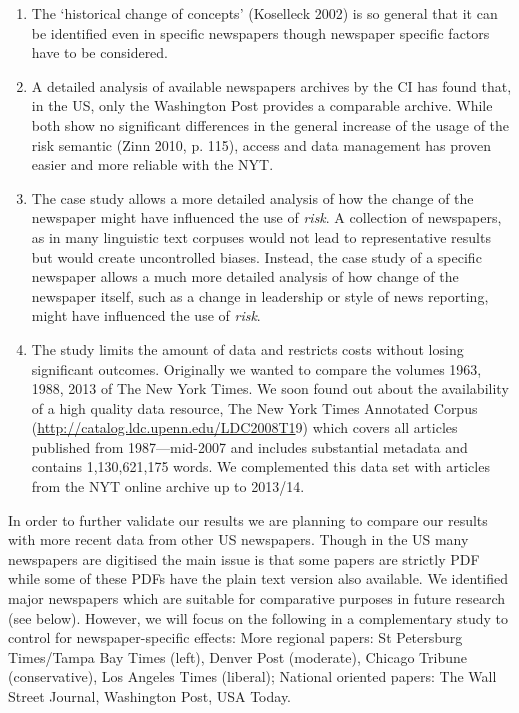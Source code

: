 \begin{enumerate}
\item The `historical change of concepts' (Koselleck 2002) is so general that it can be identified even in specific newspapers though newspaper specific factors have to be considered. 
\item A detailed analysis of available newspapers archives by the CI has found that, in the US, only the Washington Post provides a comparable archive. While both show no significant differences in the general increase of the usage of the risk semantic (Zinn 2010, p. 115), access and data management has proven easier and more reliable with the NYT. 
\item The case study allows a more detailed analysis of how the change of the newspaper might have influenced the use of \emph{risk}. A collection of newspapers, as in many linguistic text corpuses would not lead to representative results but would create uncontrolled biases. Instead, the case study of a specific newspaper allows a much more detailed analysis of how change of the newspaper itself, such as a change in leadership or style of news reporting, might have influenced the use of \emph{risk}.  
\item The study limits the amount of data and restricts costs without losing significant outcomes.
Originally we wanted to compare the volumes 1963, 1988, 2013 of The New York Times. We soon found out about the availability of a high quality data resource, The New York Times Annotated Corpus (\url{http://catalog.ldc.upenn.edu/LDC2008T1}9) which covers all articles published from 1987---mid-2007 and includes substantial metadata and contains 1,130,621,175 words. We complemented this data set with articles from the NYT online archive up to 2013\slash 14.
\end{enumerate}
%
In order to further validate our results we are planning to compare our results with more recent data from other US newspapers. Though in the US many newspapers are digitised the main issue is that some papers are strictly PDF while some of these PDFs have the plain text version also available. We identified major newspapers which are suitable for comparative purposes in future research (see below). However, we will focus on the following in a complementary study to control for newspaper-specific effects: More regional papers: St Petersburg Times\slash Tampa Bay Times (left), Denver Post (moderate), Chicago Tribune (conservative), Los Angeles Times (liberal); National oriented papers: The Wall Street Journal, Washington Post, USA Today.

